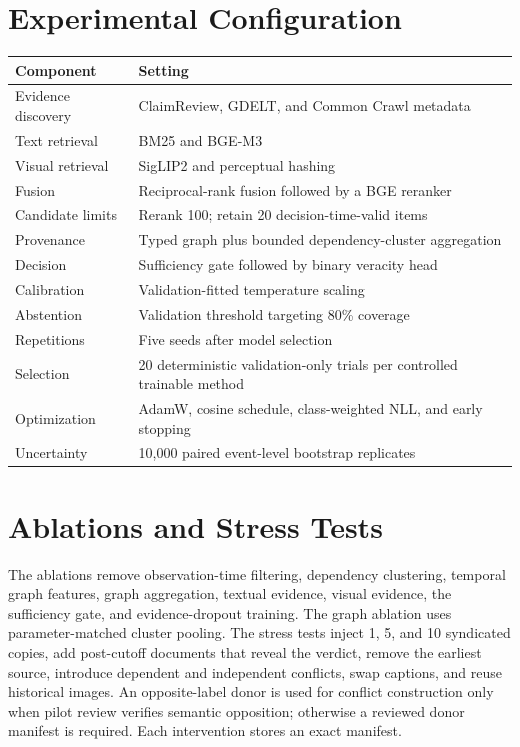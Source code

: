 \documentclass[11pt]{article}
\begin{document}
\section{Experimental Configuration}
\begin{center}
\small
\begin{tabularx}{\textwidth}{p{}X}
\toprule
Component & Setting \\
\midrule
Evidence discovery & ClaimReview, GDELT, and Common Crawl metadata \\
Text retrieval & BM25 and BGE-M3 \\
Visual retrieval & SigLIP2 and perceptual hashing \\
Fusion & Reciprocal-rank fusion followed by a BGE reranker \\
Candidate limits & Rerank 100; retain 20 decision-time-valid items \\
Provenance & Typed graph plus bounded dependency-cluster aggregation \\
Decision & Sufficiency gate followed by binary veracity head \\
Calibration & Validation-fitted temperature scaling \\
Abstention & Validation threshold targeting 80\% coverage \\
Repetitions & Five seeds after model selection \\
Selection & 20 deterministic validation-only trials per controlled trainable method \\
Optimization & AdamW, cosine schedule, class-weighted NLL, and early stopping \\
Uncertainty & 10,000 paired event-level bootstrap replicates \\
\bottomrule
\end{tabularx}
\end{center}

\section{Ablations and Stress Tests}
The ablations remove observation-time filtering, dependency clustering, temporal graph features, graph aggregation, textual evidence, visual evidence, the sufficiency gate, and evidence-dropout training. The graph ablation uses parameter-matched cluster pooling. The stress tests inject 1, 5, and 10 syndicated copies, add post-cutoff documents that reveal the verdict, remove the earliest source, introduce dependent and independent conflicts, swap captions, and reuse historical images. An opposite-label donor is used for conflict construction only when pilot review verifies semantic opposition; otherwise a reviewed donor manifest is required. Each intervention stores an exact manifest.
\end{document}
